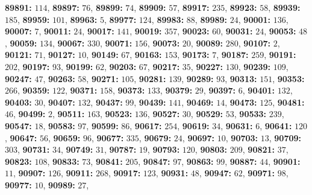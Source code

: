 \textsf{\bfseries 89891:} $114$, \textsf{\bfseries 89897:} $76$, \textsf{\bfseries 89899:} $74$, \textsf{\bfseries 89909:} $57$, \textsf{\bfseries 89917:} $235$, \textsf{\bfseries 89923:} $58$, \textsf{\bfseries 89939:} $185$, \textsf{\bfseries 89959:} $101$, \textsf{\bfseries 89963:} $5$, \textsf{\bfseries 89977:} $124$, \textsf{\bfseries 89983:} $88$, \textsf{\bfseries 89989:} $24$, \textsf{\bfseries 90001:} $136$, \textsf{\bfseries 90007:} $7$, \textsf{\bfseries 90011:} $24$, \textsf{\bfseries 90017:} $141$, \textsf{\bfseries 90019:} $357$, \textsf{\bfseries 90023:} $60$, \textsf{\bfseries 90031:} $24$, \textsf{\bfseries 90053:} $48$, \textsf{\bfseries 90059:} $134$, \textsf{\bfseries 90067:} $330$, \textsf{\bfseries 90071:} $156$, \textsf{\bfseries 90073:} $20$, \textsf{\bfseries 90089:} $280$, \textsf{\bfseries 90107:} $2$, \textsf{\bfseries 90121:} $71$, \textsf{\bfseries 90127:} $10$, \textsf{\bfseries 90149:} $67$, \textsf{\bfseries 90163:} $153$, \textsf{\bfseries 90173:} $7$, \textsf{\bfseries 90187:} $259$, \textsf{\bfseries 90191:} $202$, \textsf{\bfseries 90197:} $93$, \textsf{\bfseries 90199:} $62$, \textsf{\bfseries 90203:} $67$, \textsf{\bfseries 90217:} $35$, \textsf{\bfseries 90227:} $130$, \textsf{\bfseries 90239:} $109$, \textsf{\bfseries 90247:} $47$, \textsf{\bfseries 90263:} $58$, \textsf{\bfseries 90271:} $105$, \textsf{\bfseries 90281:} $139$, \textsf{\bfseries 90289:} $93$, \textsf{\bfseries 90313:} $151$, \textsf{\bfseries 90353:} $266$, \textsf{\bfseries 90359:} $122$, \textsf{\bfseries 90371:} $158$, \textsf{\bfseries 90373:} $133$, \textsf{\bfseries 90379:} $29$, \textsf{\bfseries 90397:} $6$, \textsf{\bfseries 90401:} $132$, \textsf{\bfseries 90403:} $30$, \textsf{\bfseries 90407:} $132$, \textsf{\bfseries 90437:} $99$, \textsf{\bfseries 90439:} $141$, \textsf{\bfseries 90469:} $14$, \textsf{\bfseries 90473:} $125$, \textsf{\bfseries 90481:} $46$, \textsf{\bfseries 90499:} $2$, \textsf{\bfseries 90511:} $163$, \textsf{\bfseries 90523:} $136$, \textsf{\bfseries 90527:} $30$, \textsf{\bfseries 90529:} $53$, \textsf{\bfseries 90533:} $239$, \textsf{\bfseries 90547:} $18$, \textsf{\bfseries 90583:} $97$, \textsf{\bfseries 90599:} $86$, \textsf{\bfseries 90617:} $254$, \textsf{\bfseries 90619:} $34$, \textsf{\bfseries 90631:} $6$, \textsf{\bfseries 90641:} $120$, \textsf{\bfseries 90647:} $56$, \textsf{\bfseries 90659:} $96$, \textsf{\bfseries 90677:} $335$, \textsf{\bfseries 90679:} $24$, \textsf{\bfseries 90697:} $10$, \textsf{\bfseries 90703:} $13$, \textsf{\bfseries 90709:} $303$, \textsf{\bfseries 90731:} $34$, \textsf{\bfseries 90749:} $31$, \textsf{\bfseries 90787:} $19$, \textsf{\bfseries 90793:} $120$, \textsf{\bfseries 90803:} $209$, \textsf{\bfseries 90821:} $37$, \textsf{\bfseries 90823:} $108$, \textsf{\bfseries 90833:} $73$, \textsf{\bfseries 90841:} $205$, \textsf{\bfseries 90847:} $97$, \textsf{\bfseries 90863:} $99$, \textsf{\bfseries 90887:} $44$, \textsf{\bfseries 90901:} $11$, \textsf{\bfseries 90907:} $126$, \textsf{\bfseries 90911:} $268$, \textsf{\bfseries 90917:} $123$, \textsf{\bfseries 90931:} $48$, \textsf{\bfseries 90947:} $62$, \textsf{\bfseries 90971:} $98$, \textsf{\bfseries 90977:} $10$, \textsf{\bfseries 90989:} $27$, 
